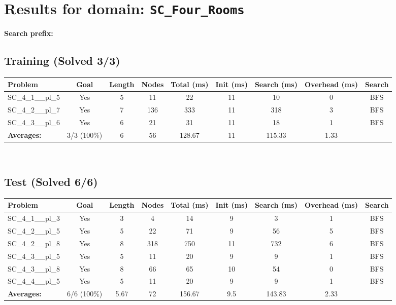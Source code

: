 \documentclass{article}
\begin{document}
\section*{Results for domain: \texttt{SC\_Four\_Rooms}}
\textbf{Search prefix:} 
\\[0.5cm]
\subsection*{Training (Solved 3/3)}
\begin{tabular}{lcccccccc}
\toprule
Problem & Goal & Length & Nodes & Total (ms) & Init (ms) & Search (ms) & Overhead (ms) & Search \\
\midrule
SC\_4\_1\_\_pl\_5 & Yes & 5 & 11 & 22 & 11 & 10 & 0 & BFS \\
SC\_4\_2\_\_pl\_7 & Yes & 7 & 136 & 333 & 11 & 318 & 3 & BFS \\
SC\_4\_3\_\_pl\_6 & Yes & 6 & 21 & 31 & 11 & 18 & 1 & BFS \\
\textbf{Averages:} & 3/3 (100\%) & 6 & 56 & 128.67 & 11 & 115.33 & 1.33 & \\
\bottomrule
\end{tabular}
\\[0.7cm]
\subsection*{Test (Solved 6/6)}
\begin{tabular}{lcccccccc}
\toprule
Problem & Goal & Length & Nodes & Total (ms) & Init (ms) & Search (ms) & Overhead (ms) & Search \\
\midrule
SC\_4\_1\_\_pl\_3 & Yes & 3 & 4 & 14 & 9 & 3 & 1 & BFS \\
SC\_4\_2\_\_pl\_5 & Yes & 5 & 22 & 71 & 9 & 56 & 5 & BFS \\
SC\_4\_2\_\_pl\_8 & Yes & 8 & 318 & 750 & 11 & 732 & 6 & BFS \\
SC\_4\_3\_\_pl\_5 & Yes & 5 & 11 & 20 & 9 & 9 & 1 & BFS \\
SC\_4\_3\_\_pl\_8 & Yes & 8 & 66 & 65 & 10 & 54 & 0 & BFS \\
SC\_4\_4\_\_pl\_5 & Yes & 5 & 11 & 20 & 9 & 9 & 1 & BFS \\
\textbf{Averages:} & 6/6 (100\%) & 5.67 & 72 & 156.67 & 9.5 & 143.83 & 2.33 & \\
\bottomrule
\end{tabular}
\\[0.7cm]
\end{document}
